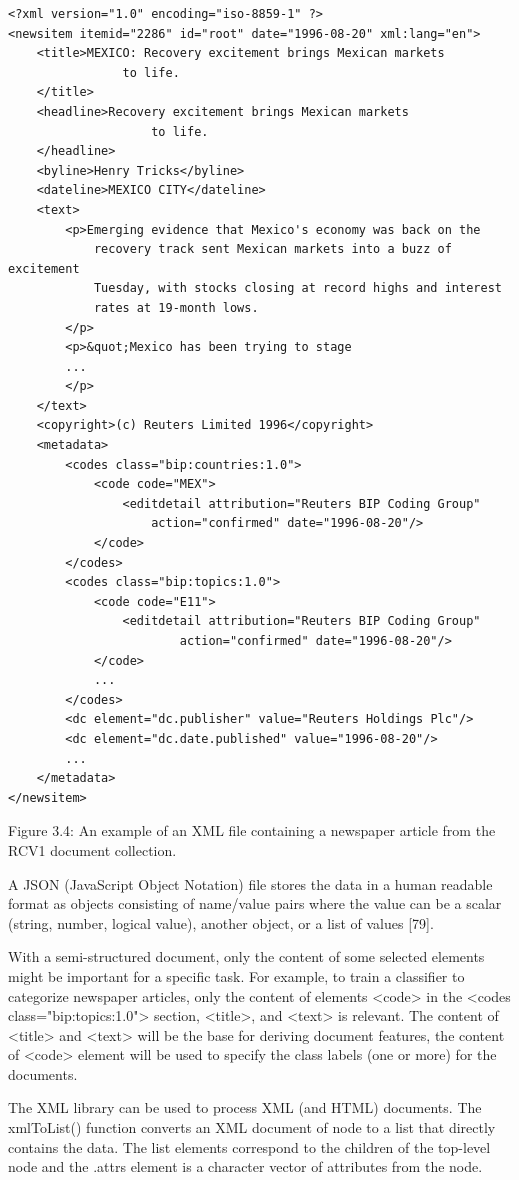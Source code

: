 \documentclass[10pt]{book}
\begin{document}
\begin{verbatim}
<?xml version="1.0" encoding="iso-8859-1" ?>
<newsitem itemid="2286" id="root" date="1996-08-20" xml:lang="en">
    <title>MEXICO: Recovery excitement brings Mexican markets
                to life.
    </title>
    <headline>Recovery excitement brings Mexican markets
                    to life.
    </headline>
    <byline>Henry Tricks</byline>
    <dateline>MEXICO CITY</dateline>
    <text>
        <p>Emerging evidence that Mexico's economy was back on the
            recovery track sent Mexican markets into a buzz of excitement
            Tuesday, with stocks closing at record highs and interest
            rates at 19-month lows.
        </p>
        <p>&quot;Mexico has been trying to stage
        ...
        </p>
    </text>
    <copyright>(c) Reuters Limited 1996</copyright>
    <metadata>
        <codes class="bip:countries:1.0">
            <code code="MEX">
                <editdetail attribution="Reuters BIP Coding Group"
                    action="confirmed" date="1996-08-20"/>
            </code>
        </codes>
        <codes class="bip:topics:1.0">
            <code code="E11">
                <editdetail attribution="Reuters BIP Coding Group"
                        action="confirmed" date="1996-08-20"/>
            </code>
            ...
        </codes>
        <dc element="dc.publisher" value="Reuters Holdings Plc"/>
        <dc element="dc.date.published" value="1996-08-20"/>
        ...
    </metadata>
</newsitem>
\end{verbatim}

Figure 3.4: An example of an XML file containing a newspaper article from the RCV1 document collection.

A JSON (JavaScript Object Notation) file stores the data in a human readable format as objects consisting of name/value pairs where the value can be a scalar (string, number, logical value), another object, or a list of values [79].

With a semi-structured document, only the content of some selected elements might be important for a specific task. For example, to train a classifier to categorize newspaper articles, only the content of elements <code> in the <codes class="bip:topics:1.0"> section, <title>, and <text> is relevant. The content of <title> and <text> will be the base for deriving document features, the content of <code> element will be used to specify the class labels (one or more) for the documents.

The XML library can be used to process XML (and HTML) documents. The xmlToList() function converts an XML document of node to a list that directly contains the data. The list elements correspond to the children of the top-level node and the .attrs element is a character vector of attributes from the node.
\end{document}

